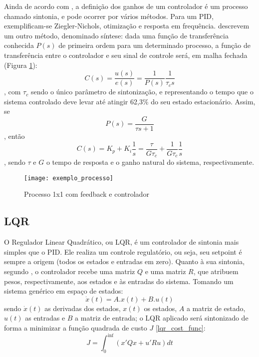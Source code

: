 Ainda de acordo com , a definição dos ganhos de um controlador é um processo chamado sintonia, e pode ocorrer por vários métodos. Para um PID, exemplificam-se Ziegler-Nichols, otimização e resposta em frequência.  descrevem um outro método, denominado síntese: dada uma função de transferência conhecida $P(s)$ de primeira ordem para um determinado processo, a função de transferência entre o controlador e seu sinal de controle será, em malha fechada (Figura \ref{img_exemplo_processo}):
\begin{equation}
C(s) = \frac{u(s)}{e(s)} = \frac{1}{P(s)} \frac{1}{\tau_c s}
\end{equation}
, com $\tau_c$ sendo o único parâmetro de sintonização, e representando o tempo que o sistema controlado deve levar até atingir 62,3\% do seu estado estacionário. Assim, se 
\begin{equation}
P(s) = \frac{G}{\tau s + 1}
\end{equation}
, então
\begin{equation}
C(s) = K_p + K_i \frac{1}{s} = \frac{\tau}{G \tau_c} + \frac{1}{G \tau_c} \frac{1}{s}
\label{sintese_controlador}
\end{equation}
, sendo $\tau$ e $G$ o tempo de resposta e o ganho natural do sistema, respectivamente.

\begin{figure}[hbt]
	\centering
	\caption{Processo 1x1 com feedback e controlador}
	\texttt{[image: exemplo\_processo]}
	\label{img_exemplo_processo}
\end{figure}

\subsection{LQR}

O Regulador Linear Quadrático, ou LQR, é um controlador de sintonia mais simples que o PID. Ele realiza um controle regulatório, ou seja, seu setpoint é sempre a origem (todos os estados e entradas em zero). Quanto à sua sintonia, segundo , o controlador recebe uma matriz $Q$ e uma matriz $R$, que atribuem pesos, respectivamente, aos estados e às entradas do sistema. Tomando um sistema genérico em espaço de estados:
\begin{equation}
\dot{x}(t) = A.x(t) + B.u(t)
\end{equation}
sendo $\dot{x}(t)$ as derivadas dos estados, $x(t)$ os estados, $A$ a matriz de estado, $u(t)$ as entradas e $B$ a matriz de entrada; o LQR aplicado será sintonizado de forma a minimizar a função quadrada de custo $J$ \ref{lqr_cost_func}:
\begin{equation}
J = \int_{0}^{\inf}(x'Qx + u'Ru)dt
\label{lqr_cost_func}
\end{equation} 

